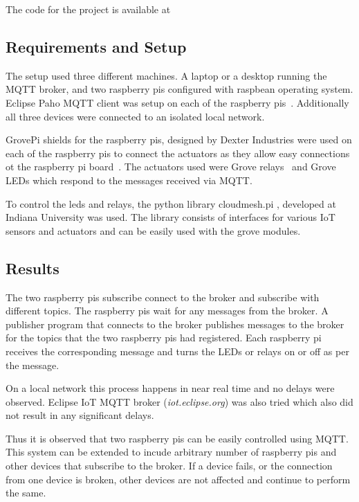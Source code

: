 The code for the project is available at 


\subsection{Requirements and Setup}

The setup used three different machines. A laptop or a desktop running
the MQTT broker, and two raspberry pis configured with raspbean
operating system. Eclipse Paho MQTT client was setup on each of the
raspberry pis~\cite{python-paho-mqtt}. Additionally all three devices
were connected to an isolated local network.

GrovePi shields for the raspberry pis, designed by Dexter Industries
were used on each of the raspberry pis to connect the actuators as
they allow easy connections ot the raspberry pi board~\cite{grovepi}.
The actuators used were Grove relays~\cite{grove-relay} and Grove LEDs
\cite{grove-led} which respond to the messages received via MQTT.

To control the leds and relays, the python library cloudmesh.pi
\cite{cloudmesh.pi}, developed at Indiana University was used. The
library consists of interfaces for various IoT sensors and actuators
and can be easily used with the grove modules.



\subsection{Results}

The two raspberry pis subscribe connect to the broker and subscribe
with different topics. The raspberry pis wait for any messages from
the broker. A publisher program that connects to the broker publishes
messages to the broker for the topics that the two raspberry pis had
registered. Each raspberry pi receives the corresponding message and
turns the LEDs or relays on or off as per the message.

On a local network this process happens in near real time and no
delays were observed. Eclipse IoT MQTT broker (\textit{iot.eclipse.org})
was also tried which also did not result in any significant delays.

Thus it is observed that two raspberry pis can be easily controlled
using MQTT. This system can be extended to incude arbitrary number of
raspberry pis and other devices that subscribe to the broker. If a
device fails, or the connection from one device is broken, other
devices are not affected and continue to perform the same.

